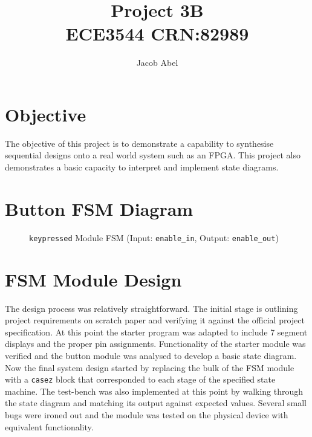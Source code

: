 \documentclass[12pt,letterpaper,titlepage]{article}
\author{Jacob Abel}
\title{	Project 3B
	\\\large ECE3544 CRN:82989
}
\begin{document}



\maketitle
\begin{raggedright}

\section*{Objective}
The objective of this project is to demonstrate a capability to synthesise sequential designs onto a real world system such as an FPGA. This project also demonstrates a basic capacity to interpret and implement state diagrams.

\section{Button FSM Diagram}

\begin{figure}[ht]
\centering
{}
\caption{\texttt{keypressed} Module FSM (Input: \texttt{enable\_in}, Output: \texttt{enable\_out})}
\end{figure}

\clearpage
\section{FSM Module Design}
The design process was relatively straightforward. The initial stage is outlining project requirements on scratch paper and verifying it against the official project specification. At this point the starter program was adapted to include 7 segment displays and the proper pin assignments. Functionality of the starter module was verified and the button module was analysed to develop a basic state diagram. Now the final system design started by replacing the bulk of the FSM module with a \texttt{casez} block that corresponded to each stage of the specified state machine. The test-bench was also implemented at this point by walking through the state diagram and matching its output against expected values. Several small bugs were ironed out and the module was tested on the physical device with equivalent functionality.


\end{raggedright}
\end{document}

